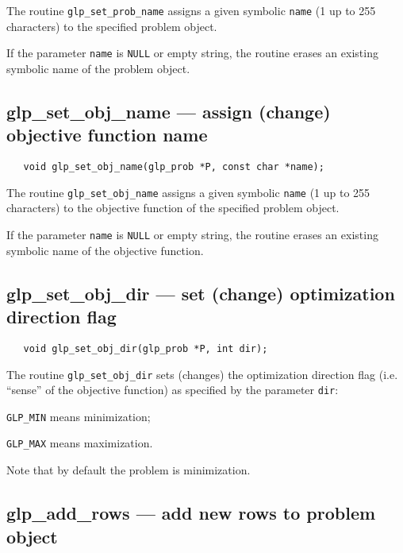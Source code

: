 \description

The routine \verb|glp_set_prob_name| assigns a given symbolic
\verb|name| (1 up to 255 characters) to the specified problem object.

If the parameter \verb|name| is \verb|NULL| or empty string, the
routine erases an existing symbolic name of the problem object.

\subsection{glp\_set\_obj\_name --- assign (change) objective function
name}

\synopsis

\begin{verbatim}
   void glp_set_obj_name(glp_prob *P, const char *name);
\end{verbatim}

\description

The routine \verb|glp_set_obj_name| assigns a given symbolic
\verb|name| (1 up to 255 characters) to the objective function of the
specified problem object.

If the parameter \verb|name| is \verb|NULL| or empty string, the
routine erases an existing symbolic name of the objective function.

\newpage

\subsection{glp\_set\_obj\_dir --- set (change) optimization direction
flag}

\synopsis

\begin{verbatim}
   void glp_set_obj_dir(glp_prob *P, int dir);
\end{verbatim}

\description

The routine \verb|glp_set_obj_dir| sets (changes) the optimization
direction flag (i.e. ``sense'' of the objective function) as specified
by the parameter \verb|dir|:

\verb|GLP_MIN| means minimization;

\verb|GLP_MAX| means maximization.

Note that by default the problem is minimization.

\subsection{glp\_add\_rows --- add new rows to problem object}


